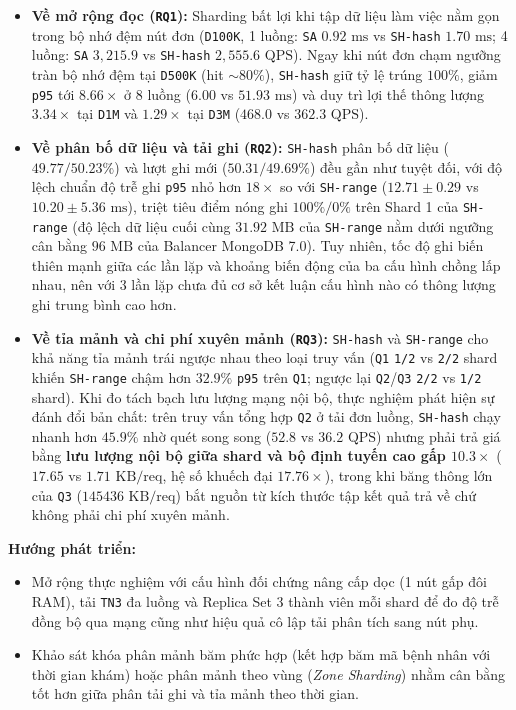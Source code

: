 \begin{itemize}[leftmargin=0.8cm, itemsep=4pt]
  \item \textbf{Về mở rộng đọc (\texttt{RQ1}):} Sharding bất lợi khi tập dữ liệu làm việc nằm gọn trong bộ nhớ đệm nút đơn (\texttt{D100K}, 1 luồng: \texttt{SA} $0.92\text{ ms}$ vs \texttt{SH-hash} $1.70\text{ ms}$; 4 luồng: \texttt{SA} $3{,}215.9$ vs \texttt{SH-hash} $2{,}555.6\text{ QPS}$). Ngay khi nút đơn chạm ngưỡng tràn bộ nhớ đệm tại \texttt{D500K} (hit $\sim 80\%$), \texttt{SH-hash} giữ tỷ lệ trúng $100\%$, giảm \texttt{p95} tới $8.66\times$ ở 8 luồng ($6.00$ vs $51.93\text{ ms}$) và duy trì lợi thế thông lượng $3.34\times$ tại \texttt{D1M} và $1.29\times$ tại \texttt{D3M} ($468.0$ vs $362.3\text{ QPS}$).
  \item \textbf{Về phân bố dữ liệu và tải ghi (\texttt{RQ2}):} \texttt{SH-hash} phân bố dữ liệu ($49.77/50.23\%$) và lượt ghi mới ($50.31/49.69\%$) đều gần như tuyệt đối, với độ lệch chuẩn độ trễ ghi \texttt{p95} nhỏ hơn $18\times$ so với \texttt{SH-range} ($12.71 \pm 0.29$ vs $10.20 \pm 5.36\text{ ms}$), triệt tiêu điểm nóng ghi $100\%/0\%$ trên Shard 1 của \texttt{SH-range} (độ lệch dữ liệu cuối cùng $31.92\text{ MB}$ của \texttt{SH-range} nằm dưới ngưỡng cân bằng $96\text{ MB}$ của Balancer MongoDB 7.0). Tuy nhiên, tốc độ ghi biến thiên mạnh giữa các lần lặp và khoảng biến động của ba cấu hình chồng lấp nhau, nên với $3$ lần lặp chưa đủ cơ sở kết luận cấu hình nào có thông lượng ghi trung bình cao hơn.
  \item \textbf{Về tỉa mảnh và chi phí xuyên mảnh (\texttt{RQ3}):} \texttt{SH-hash} và \texttt{SH-range} cho khả năng tỉa mảnh trái ngược nhau theo loại truy vấn (\texttt{Q1} \texttt{1/2} vs \texttt{2/2} shard khiến \texttt{SH-range} chậm hơn $32.9\%$ \texttt{p95} trên \texttt{Q1}; ngược lại \texttt{Q2}/\texttt{Q3} \texttt{2/2} vs \texttt{1/2} shard). Khi đo tách bạch lưu lượng mạng nội bộ, thực nghiệm phát hiện sự đánh đổi bản chất: trên truy vấn tổng hợp \texttt{Q2} ở tải đơn luồng, \texttt{SH-hash} chạy nhanh hơn $45.9\%$ nhờ quét song song ($52.8$ vs $36.2\text{ QPS}$) nhưng phải trả giá bằng \textbf{lưu lượng nội bộ giữa shard và bộ định tuyến cao gấp $10.3\times$} ($17.65$ vs $1.71\text{ KB/req}$, hệ số khuếch đại $17.76\times$), trong khi băng thông lớn của \texttt{Q3} ($145$\textendash $436\text{ KB/req}$) bắt nguồn từ kích thước tập kết quả trả về chứ không phải chi phí xuyên mảnh.
\end{itemize}

\textbf{Hướng phát triển:}
\begin{itemize}[leftmargin=0.8cm, itemsep=4pt]
  \item Mở rộng thực nghiệm với cấu hình đối chứng nâng cấp dọc (1 nút gấp đôi RAM), tải \texttt{TN3} đa luồng và Replica Set 3 thành viên mỗi shard để đo độ trễ đồng bộ qua mạng cũng như hiệu quả cô lập tải phân tích sang nút phụ.
  \item Khảo sát khóa phân mảnh băm phức hợp (kết hợp băm mã bệnh nhân với thời gian khám) hoặc phân mảnh theo vùng (\textit{Zone Sharding}) nhằm cân bằng tốt hơn giữa phân tải ghi và tỉa mảnh theo thời gian.
\end{itemize}
\FloatBarrier
